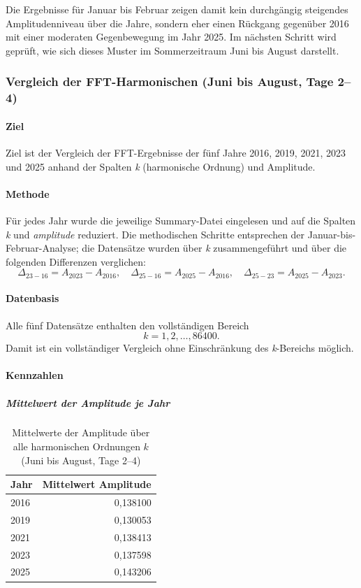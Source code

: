\documentclass[12pt,oneside]{article}
\begin{document}
Die Ergebnisse für Januar bis Februar zeigen damit kein durchgängig steigendes Amplitudenniveau über die Jahre,
sondern eher einen Rückgang gegenüber 2016 mit einer moderaten Gegenbewegung im Jahr 2025. Im nächsten Schritt
wird geprüft, wie sich dieses Muster im Sommerzeitraum Juni bis August darstellt.

\subsubsection{Vergleich der FFT-Harmonischen (Juni bis August, Tage 2--4)}
\label{sec:fft_jun_aug_tage2_4}

\paragraph{Ziel}
Ziel ist der Vergleich der FFT-Ergebnisse der fünf Jahre 2016, 2019, 2021, 2023 und 2025 anhand der Spalten
\textit{k} (harmonische Ordnung) und Amplitude.

\paragraph{Methode}
Für jedes Jahr wurde die jeweilige Summary-Datei eingelesen und auf die Spalten \textit{k} und
\textit{amplitude} reduziert. Die methodischen Schritte entsprechen der Januar-bis-Februar-Analyse; die Datensätze
wurden über \textit{k} zusammengeführt und über die folgenden Differenzen verglichen:
\[
\Delta_{23-16} = A_{2023} - A_{2016}, \quad
\Delta_{25-16} = A_{2025} - A_{2016}, \quad
\Delta_{25-23} = A_{2025} - A_{2023}.
\]

\paragraph{Datenbasis}
Alle fünf Datensätze enthalten den vollständigen Bereich
\[
k = 1,2,\dots,86400.
\]
Damit ist ein vollständiger Vergleich ohne Einschränkung des \textit{k}-Bereichs möglich.

\paragraph{Kennzahlen}

\subparagraph{Mittelwert der Amplitude je Jahr}
\begin{table}[H]
\centering
\begin{tabular}{lr}
\toprule
Jahr & Mittelwert Amplitude \\
\midrule
2016 & 0,138100 \\
2019 & 0,130053 \\
2021 & 0,138413 \\
2023 & 0,137598 \\
2025 & 0,143206 \\
\bottomrule
\end{tabular}
\caption{Mittelwerte der Amplitude über alle harmonischen Ordnungen $k$ (Juni bis August, Tage 2--4)}
\end{table}
\end{document}
